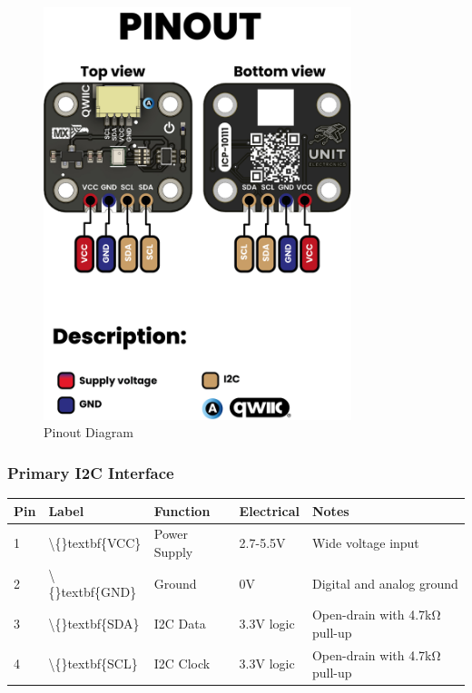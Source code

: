 \documentclass[11pt,a4paper]{article}
\begin{document}
\begin{figure}[H]
\centering
\includegraphics[width=0.8\textwidth]{unit_pinout_v_0_0_1_ue0094_icp10111_barometric_pressure_sensor_en.jpg}
\caption{Pinout Diagram}
\end{figure}

\subsubsection{Primary I2C Interface}

\begin{table}[H]
\centering
\begin{tabular}{lllll}
\toprule
Pin & Label & Function & Electrical & Notes \\
\midrule
1 & \textbackslash\{\}textbf\{VCC\} & Power Supply & 2.7-5.5V & Wide voltage input \\
2 & \textbackslash\{\}textbf\{GND\} & Ground & 0V & Digital and analog ground \\
3 & \textbackslash\{\}textbf\{SDA\} & I2C Data & 3.3V logic & Open-drain with 4.7kΩ pull-up \\
4 & \textbackslash\{\}textbf\{SCL\} & I2C Clock & 3.3V logic & Open-drain with 4.7kΩ pull-up \\
\bottomrule
\end{tabular}
\end{table}
\end{document}
